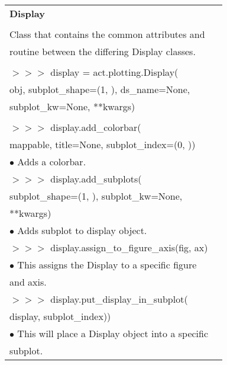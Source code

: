 \documentclass[potrait, z1paper, fontscale=0.33]{baposter} %
\begin{document}
\begin{poster}
{\begin{flushleft}
\begin{tabular}{@{}ll@{}}
\multicolumn{2}{l}{\cellcolor[HTML]{DDFFFF}\bf Display} \\
\\
Class that contains the common attributes and\\
routine between the differing Display classes.\\
\\
$>$$>$$>$ display = act.plotting.Display(\\
\-\hspace{1.2cm} obj, subplot\_shape=(1, ), ds\_name=None,\\
\-\hspace{1.2cm} subplot\_kw=None, **kwargs)\\
\\
$>$$>$$>$ display.add\_colorbar(\\
\-\hspace{1.2cm} mappable, title=None, subplot\_index=(0, ))\\
\-\hspace{0.2cm} $\bullet$ Adds a colorbar.\\
$>$$>$$>$ display.add\_subplots(\\
\-\hspace{1.2cm} subplot\_shape=(1, ), subplot\_kw=None,\\
\-\hspace{1.2cm} **kwargs)\\
\-\hspace{0.5cm} $\bullet$ Adds subplot to display object.\\
$>$$>$$>$ display.assign\_to\_figure\_axis(fig, ax)\\
\-\hspace{0.2cm} $\bullet$ This assigns the Display to a specific figure\\
\-\hspace{0.5cm} and axis.\\
$>$$>$$>$ display.put\_display\_in\_subplot(\\
\-\hspace{1.2cm} display, subplot\_index))\\
\-\hspace{0.2cm} $\bullet$ This will place a Display object into a specific\\
\-\hspace{0.5cm} subplot. 
\end{tabular}


\end{flushleft}}
\end{poster}
\end{document}
